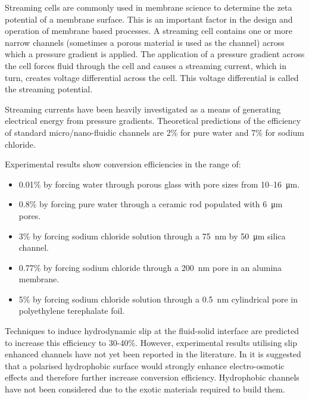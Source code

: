 \documentclass[10pt,final,journal]{IEEEtran}
\begin{document}
    Streaming cells are commonly used in membrane science to determine the zeta potential of a membrane surface.
    This is an important factor in the design and operation of membrane based processes.\cite{Daiguji2004b}
    A streaming cell contains one or more narrow channels (sometimes a porous material is used as the channel) across which a pressure gradient is applied.
    The application of a pressure gradient across the cell forces fluid through the cell and causes a streaming current, which in turn, creates voltage differential across the cell.
    This voltage differential is called the streaming potential.

    Streaming currents have been heavily investigated as a means of generating electrical energy from pressure gradients.
    \cite{Chang2009,Daiguji2006,Daiguji2004b,Davidson2008a,Davidson2008,CherngHon2012,Jiao2014,Lu2006,Olthuis2005,Osterle1964,Pennathur2007,Ren2008a,VanderHeyden2006,Heyden2007,Xie2008,Yang2003}
    Theoretical predictions of the efficiency of standard micro/nano-fluidic channels are 2\% for pure water and 7\% for sodium chloride.
    \cite{VanderHeyden2006}
    
    Experimental results show conversion efficiencies in the range of:
    \begin{itemize}
        \item 0.01\% by forcing water through porous glass with pore sizes from 10\thinspace--\SI{16}{\micro\metre}.\cite{Yang2003}
        \item 0.8\% by forcing pure water through a ceramic rod populated with \SI{6}{\micro\metre} pores. \cite{Yang2004}
        \item 3\% by forcing sodium chloride solution through a \SI{75}{\nano\metre} by \SI{50}{\micro\metre} silica channel. \cite{Heyden2007}
        \item 0.77\% by forcing sodium chloride through a \SI{200}{\nano\metre} pore in an alumina membrane. \cite{Lu2006}
        \item 5\% by forcing sodium chloride solution through a \SI{0.5}{\nano\metre} cylindrical pore in polyethylene terephalate foil. \cite{Xie2008}
    \end{itemize}

    Techniques to induce hydrodynamic slip at the fluid-solid interface are predicted to increase this efficiency to 30-40\%. \cite{Davidson2008a, Ren2008a}
    However, experimental results utilising slip enhanced channels have not yet been reported in the literature.
    In \cite{Joly2006} it is suggested that a polarised hydrophobic surface would strongly enhance electro-osmotic effects and therefore further increase conversion efficiency.
    Hydrophobic channels have not been considered due to the exotic materials required to build them.
\end{document}

